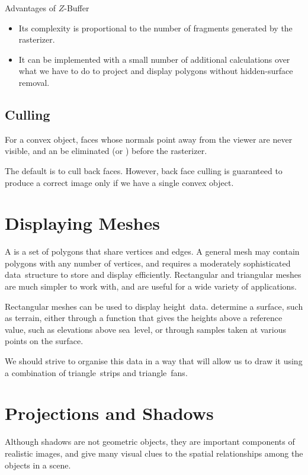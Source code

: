 \documentclass[../COS3712_Notes.tex]{subfiles}
\begin{document}
      \begin{sidenote}{Advantages of $Z$-Buffer}
        $ $\vspace{-1em}
        \begin{itemize}
          \item Its complexity is proportional to the number of fragments generated
            by the rasterizer.
          \item It can be implemented with a small number of additional calculations
            over what we have to do to project and display polygons without
            hidden-surface removal.
        \end{itemize}
      \end{sidenote}

      \subsection{Culling}
        For a convex object, faces whose normals point away from the viewer are never visible,
        and an be eliminated (or ) before the rasterizer.

        The default is to cull back faces.
        However, back face culling is guaranteed to produce a correct image only if we have
        a single convex object.

    \section{Displaying Meshes}
      A  is a set of polygons that share vertices and edges.
      A general mesh may contain polygons with any number of vertices,
      and requires a moderately sophisticated data~structure to store and display efficiently.
      Rectangular and triangular meshes are much simpler to work with,
      and are useful for a wide variety of applications.

      Rectangular meshes can be used to display height~data.
       determine a surface, such as terrain,
      either through a function that gives the heights above a reference value,
      such as elevations above sea~level,
      or through samples taken at various points on the surface.

      We should strive to organise this data in a way that will allow us to draw it using
      a combination of triangle~strips and triangle~fans.

    \section{Projections and Shadows}
      Although shadows are not geometric objects, they are important components of realistic
      images, and give many visual clues to the spatial relationships among the objects
      in a scene.
\end{document}
